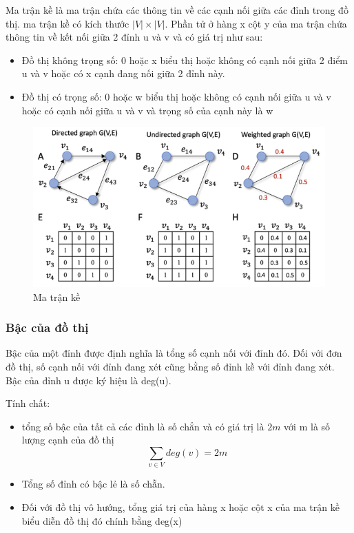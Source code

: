 Ma trận kề là ma trận chứa các thông tin về các cạnh nối giữa các đỉnh trong đồ thị. ma trận kề có kích thước $|V| \times |V|$. Phần tử ở hàng x cột y của ma trận chứa thông tin về kết nối giữa 2 đỉnh u và v và có giá trị như sau:
\begin{itemize}
	\item Đồ thị không trọng số: 0 hoặc x biểu thị hoặc không có cạnh nối giữa 2 điểm u và v hoặc có x cạnh đang nối giữa 2 đỉnh này.
	\item Đồ thị có trọng số: 0 hoặc w biểu thị hoặc không có cạnh nối giữa u và v hoặc có cạnh nối giữa u và v và trọng số của cạnh này là w
\end{itemize}

\begin{figure}[H]
    \begin{center}
        \includegraphics[scale=0.6]{images/adj-matrix}
        \caption{Ma trận kề}
        \label{fig:adj-matrix}
    \end{center}
\end{figure}


\subsubsection{Bậc của đồ thị}

Bậc của một đỉnh được định nghĩa là tổng số cạnh nối với đỉnh đó. Đối với đơn đồ thị, số cạnh nối với đỉnh đang xét cũng bằng số đỉnh kề với đỉnh đang xét. Bậc của đỉnh u được ký hiệu là deg(u).

Tính chất:
\begin{itemize}
	\item tổng số bậc của tất cả các đỉnh là số chẳn và có giá trị là $2m$ với m là số lượng cạnh của đồ thị
	\begin{equation*}
		\sum_{v \in V}{deg(v)} = 2m
	\end{equation*}
	\item Tổng số đỉnh có bậc lẻ là số chẵn.
	\item Đối với đồ thị vô hướng, tổng giá trị của hàng x hoặc cột x của ma trận kề biểu diễn đồ thị đó chính bằng deg(x)
\end{itemize}

